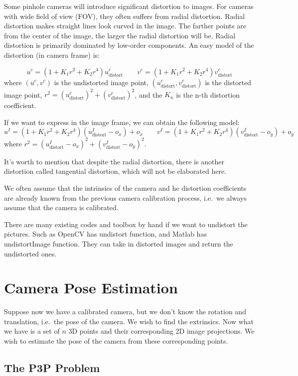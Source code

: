 \documentclass[
]{book}
\theoremstyle{definition}
\theoremstyle{definition}
\theoremstyle{definition}
\theoremstyle{definition}
\theoremstyle{remark}
\begin{document}
Some pinhole cameras will introduce significant distortion to images. For cameras with wide field of view (FOV), they often suffers from radial distortion. Radial distortion makes straight lines look curved in the image. The farther points are from the center of the image, the larger the radial distortion will be. Radial distortion is primarily dominated by low-order components. An easy model of the distortion (in camera frame) is:

\[u^c = (1+K_1r^2+K_2r^4)u^c_{\text{distort}}\quad\quad v^c = (1+K_1r^2+K_2r^4)v^c_{\text{distort}}\]
where \((u^c,v^c)\) is the undistorted image point, \((u^c_{\text{distort}},v^c_{\text{distort}})\) is the distorted image point, \(r^2=(u^c_{\text{distort}})^2 +(v^c_{\text{distort}})^2\), and the \(K_n\) is the n-th distortion coefficient.

If we want to express in the image frame, we can obtain the following model:
\[u^I = (1+K_1r^2+K_2r^4)(u^I_{\text{distort}}-o_x)+o_x\quad\quad v^I = (1+K_1r^2+K_2r^4)(v^I_{\text{distort}}-o_y)+o_y\]
where \(r^2=(u^I_{\text{distort}}-o_x)^2 +(v^I_{\text{distort}}-o_y)^2\).

It's worth to mention that despite the radial distortion, there is another distortion called tangential distortion, which will not be elaborated here.

We often assume that the intrinsics of the camera and he distortion coefficients are already known from the previous camera calibration process, i.e.~we always assume that the camera is calibrated.

There are many existing codes and toolbox by hand if we want to undistort the pictures. Such as OpenCV has undistort function, and Matlab has undistortImage function. They can take in distorted images and return the undistorted ones.

\hypertarget{camera-pose-estimation}{%
\section{Camera Pose Estimation}\label{camera-pose-estimation}}

Suppose now we have a calibrated camera, but we don't know the rotation and translation, i.e.~the pose of the camera. We wish to find the extrinsics. Now what we have is a set of \(n\) 3D points and their corresponding 2D image projections. We wish to estimate the pose of the camera from these corresponding points.

\hypertarget{the-p3p-problem}{%
\subsection{The P3P Problem}\label{the-p3p-problem}}
\end{document}
